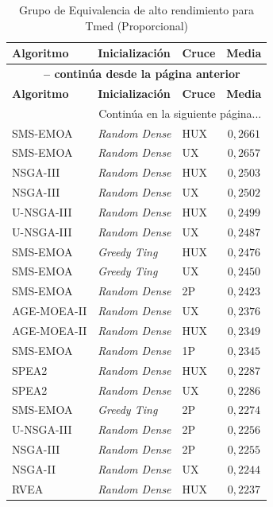 \begin{longtable}{lllc}
    \caption{Grupo de Equivalencia de alto rendimiento para Tmed (Proporcional)}
    \label{tab:elite_avgt_prop} \\
    \toprule
    \textbf{Algoritmo} & \textbf{Inicialización} & \textbf{Cruce} & \textbf{Media} \\
    \midrule
    \endfirsthead
    \multicolumn{4}{c}{{\bfseries \tablename\ \thetable{} -- continúa desde la página anterior}} \\
    \toprule
    \textbf{Algoritmo} & \textbf{Inicialización} & \textbf{Cruce} & \textbf{Media} \\
    \midrule
    \endhead
    \midrule \multicolumn{4}{r}{{Continúa en la siguiente página...}} \\
    \endfoot
    \bottomrule
    \endlastfoot
    SMS-EMOA & \textit{Random Dense} & HUX & $0{,}2661$ \\
SMS-EMOA & \textit{Random Dense} & UX & $0{,}2657$ \\
NSGA-III & \textit{Random Dense} & HUX & $0{,}2503$ \\
NSGA-III & \textit{Random Dense} & UX & $0{,}2502$ \\
U-NSGA-III & \textit{Random Dense} & HUX & $0{,}2499$ \\
U-NSGA-III & \textit{Random Dense} & UX & $0{,}2487$ \\
SMS-EMOA & \textit{Greedy Ting} & HUX & $0{,}2476$ \\
SMS-EMOA & \textit{Greedy Ting} & UX & $0{,}2450$ \\
SMS-EMOA & \textit{Random Dense} & 2P & $0{,}2423$ \\
AGE-MOEA-II & \textit{Random Dense} & UX & $0{,}2376$ \\
AGE-MOEA-II & \textit{Random Dense} & HUX & $0{,}2349$ \\
SMS-EMOA & \textit{Random Dense} & 1P & $0{,}2345$ \\
SPEA2 & \textit{Random Dense} & HUX & $0{,}2287$ \\
SPEA2 & \textit{Random Dense} & UX & $0{,}2286$ \\
SMS-EMOA & \textit{Greedy Ting} & 2P & $0{,}2274$ \\
U-NSGA-III & \textit{Random Dense} & 2P & $0{,}2256$ \\
NSGA-III & \textit{Random Dense} & 2P & $0{,}2255$ \\
NSGA-II & \textit{Random Dense} & UX & $0{,}2244$ \\
RVEA & \textit{Random Dense} & HUX & $0{,}2237$ \\

\end{longtable}

